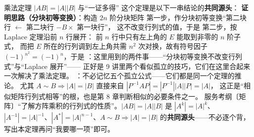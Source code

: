 \begin{fdeep}{乘法定理 $|AB|=|A||B|$ 与“一证多得”}
这个定理是以下一串结论的\textbf{共同源头}：
\textbf{证明思路（分块初等变换）}：构造 $2n$ 阶分块矩阵
第一步，作分块初等变换“第二块行 $\leftarrow$ 第二块行 $-B\times$ 第一块行”，
这不改变行列式的值，于是
第二步，按 Laplace 定理沿前 $n$ 行展开：
前 $n$ 行中只有左上角的 $E$ 能取到非零的 $n$ 阶子式，
而把 $E$ 所在的行列调到左上角共需 $n^{2}$ 次对换，故有符号因子 $(-1)^{n^{2}}=(-1)^{n}$，于是
\fbref{}：这里用到的两件事——“分块初等变换不改变行列式”与“Laplace 展开”——
正好是 9 讲里两个看似孤立的技巧，它们在这里合起来一次解决了乘法定理。
\fbref{}：不必记忆五个孤立公式——它们都是同一个定理的推论。
尤其 $A\sim B\Rightarrow|A|=|B|$ 直接来自 $|P^{-1}AP|=|P^{-1}||A||P|=|A|$，
这正是“相似矩阵行列式相等”的根，也是第 8 章判断相似的必要条件之一。
\fbref{}服务考纲〔矩阵〕“了解方阵乘积的行列式的性质”。$|AB|=|A||B|$ 是 $|A^{k}|=|A|^{k}$、$|A^{-1}|=|A|^{-1}$、$|A^{*}|=|A|^{n-1}$、$A\sim B\Rightarrow|A|=|B|$ 的\textbf{共同源头}——不必逐个背，写出本定理再问“我要哪一项”即可。
\end{fdeep}


